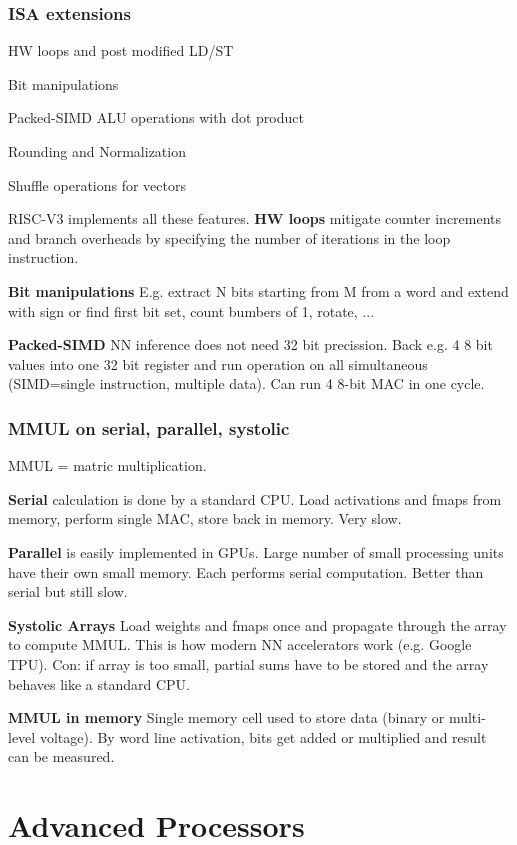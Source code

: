 \documentclass[a4paper, fontsize=8pt, landscape, DIV=1]{scrartcl}
\makeatletter
\renewenvironment{outline}[1][]{%
  \ifthenelse{\equal{#1}{}}{}{\renewcommand{\ol@type}{#1}}%
  \ol@z%
  \newcommand{\0}{\ol@toz\ol@z}%
  \newcommand{\1}{\vspace{\dimexpr\outlinespacingscalar\baselineskip-\baselineskip}\ol@toi\ol@i\item}%
  \newcommand{\2}{\vspace{\dimexpr\outlinespacingscalartwo\baselineskip-\baselineskip}\ol@toii\ol@ii\item}%
  \newcommand{\3}{\vspace{\dimexpr\outlinespacingscalar\baselineskip-\baselineskip}\ol@toiii\ol@iii\item}%
  \newcommand{\4}{\vspace{\dimexpr\outlinespacingscalar\baselineskip-\baselineskip}\ol@toiiii\ol@iiii\item}%
}{%
  \ol@toz\ol@exit%
}
\def\outlinespacingscalar{0.5}
\def\outlinespacingscalartwo{0.5}
\makeatother
\begin{document}
\begin{multicols*}{4}
  \subsubsection{ISA extensions}
  \begin{outline}
    \1 HW loops and post modified LD/ST
    \1 Bit manipulations
    \1 Packed-SIMD ALU operations with dot product
    \1 Rounding and Normalization
    \1 Shuffle operations for vectors
  \end{outline}

  RISC-V3 implements all these features.
  \textbf{HW loops} mitigate counter increments and branch overheads by specifying the
  number of iterations in the loop instruction.
  
  \textbf{Bit manipulations} E.g. extract N bits starting from M from a word and extend
  with sign or find first bit set, count bumbers of 1, rotate, ...

  \textbf{Packed-SIMD} NN inference does not need 32 bit precission. Back e.g. 4 8 bit
  values into one 32 bit register and run operation on all simultaneous (SIMD=single 
  instruction, multiple data). Can run 4 8-bit MAC in one cycle.

  \subsubsection{MMUL on serial, parallel, systolic}
  MMUL = matric multiplication.

  \textbf{Serial} calculation is done by a standard CPU. Load activations and fmaps
  from memory, perform single MAC, store back in memory. Very slow.

  \textbf{Parallel} is easily implemented in GPUs. Large number of small processing units
  have their own small memory. Each performs serial computation. Better than serial
  but still slow.

  \textbf{Systolic Arrays}
  Load weights and fmaps once and propagate through the array to compute MMUL. This is how
  modern NN accelerators work (e.g. Google TPU). Con: if array is too small, partial sums
  have to be stored and the array behaves like a standard CPU.

  \textbf{MMUL in memory} Single memory cell used to store data (binary or multi-level voltage).
  By word line activation, bits get added or multiplied and result can be measured.

  \section{Advanced Processors}


\end{multicols*}
\end{document}
